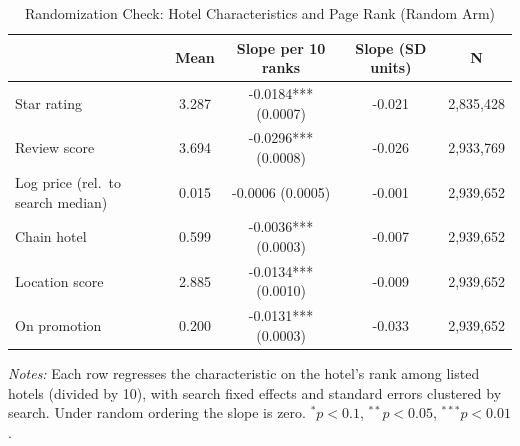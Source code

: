 \begin{table}[htbp]\centering
\caption{Randomization Check: Hotel Characteristics and Page Rank (Random Arm)}
\label{tab:randcheck}
\begin{tabular}{lcccc}
\toprule
 & Mean & Slope per 10 ranks & Slope (SD units) & N \\
\midrule
Star rating & 3.287 & -0.0184*** (0.0007) & -0.021 & 2,835,428 \\
Review score & 3.694 & -0.0296*** (0.0008) & -0.026 & 2,933,769 \\
Log price (rel.\ to search median) & 0.015 & -0.0006 (0.0005) & -0.001 & 2,939,652 \\
Chain hotel & 0.599 & -0.0036*** (0.0003) & -0.007 & 2,939,652 \\
Location score & 2.885 & -0.0134*** (0.0010) & -0.009 & 2,939,652 \\
On promotion & 0.200 & -0.0131*** (0.0003) & -0.033 & 2,939,652 \\
\bottomrule
\end{tabular}
\begin{minipage}{0.92\textwidth}\footnotesize\vspace{0.3em}
\textit{Notes:} Each row regresses the characteristic on the hotel's rank among listed hotels (divided by 10), with search fixed effects and standard errors clustered by search. Under random ordering the slope is zero. $^{*}p<0.1$, $^{**}p<0.05$, $^{***}p<0.01$.
\end{minipage}
\end{table}
